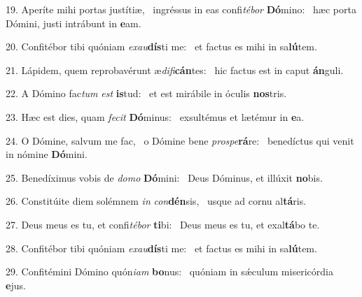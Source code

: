 19. Aperíte mihi portas justítiæ, \dag\  ingréssus in eas confi\textit{té}\textit{bor} \textbf{Dó}mino: \ast\  hæc porta Dómini, justi intrábunt in \textbf{e}am.\

20. Confitébor tibi quóniam \textit{ex}\textit{au}\textbf{dís}ti me: \ast\  et factus es mihi in sa\textbf{lú}tem.\

21. Lápidem, quem reprobavérunt æ\textit{di}\textit{fi}\textbf{cán}tes: \ast\  hic factus est in caput \textbf{án}guli.\

22. A Dómino fac\textit{tum} \textit{est} \textbf{is}tud: \ast\  et est mirábile in óculis \textbf{nos}tris.\

23. Hæc est dies, quam \textit{fe}\textit{cit} \textbf{Dó}minus: \ast\  exsultémus et lætémur in \textbf{e}a.\

24. O Dómine, salvum me fac, \dag\  o Dómine bene \textit{pro}\textit{spe}\textbf{rá}re: \ast\  benedíctus qui venit in nómine \textbf{Dó}mini.\

25. Benedíximus vobis de \textit{do}\textit{mo} \textbf{Dó}mini: \ast\  Deus Dóminus, et illúxit \textbf{no}bis.\

26. Constitúite diem solémnem \textit{in} \textit{con}\textbf{dén}sis, \ast\  usque ad cornu al\textbf{tá}ris.\

27. Deus meus es tu, et confi\textit{té}\textit{bor} \textbf{ti}bi: \ast\  Deus meus es tu, et exal\textbf{tá}bo te.\

28. Confitébor tibi quóniam \textit{ex}\textit{au}\textbf{dís}ti me: \ast\  et factus es mihi in sa\textbf{lú}tem.\

29. Confitémini Dómino quón\textit{i}\textit{am} \textbf{bo}nus: \ast\  quóniam in sǽculum misericórdia \textbf{e}jus.\


